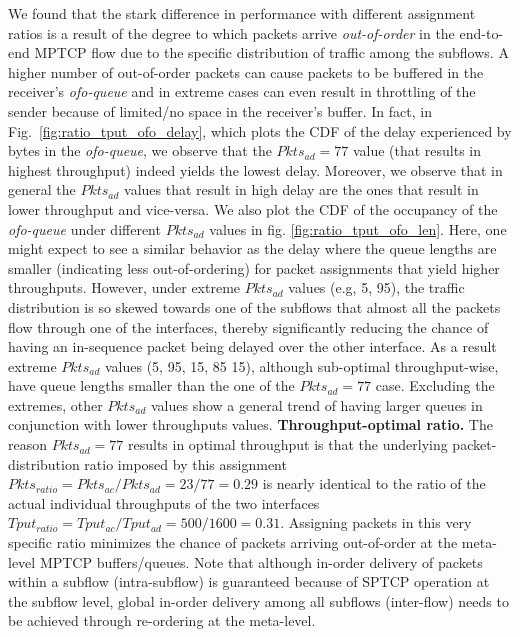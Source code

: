 We found that the stark difference in performance with different
assignment ratios is a result of the degree to which packets arrive
\textit{out-of-order} in the end-to-end MPTCP flow due to
the specific distribution of traffic among the subflows.
A higher number of out-of-order packets can cause
packets to be buffered in the receiver's \emph{ofo-queue} and in
extreme cases can even result in throttling of the sender because of
limited/no space in the receiver's buffer. In fact, in
Fig.~\ref{fig:ratio_tput_ofo_delay}, which plots the CDF of the delay
experienced by bytes in the \emph{ofo-queue}, we observe that
the $Pkts_{ad}=77$ value (that results in highest throughput) indeed
yields the lowest delay. Moreover, we observe that in general the
$Pkts_{ad}$ values that result in high delay are the ones that result
in lower throughput and vice-versa. 
We also plot the CDF of the
occupancy of the \emph{ofo-queue} under different $Pkts_{ad}$
values in fig. \ref{fig:ratio_tput_ofo_len}. Here, one might expect to
see a similar behavior as the delay where the queue lengths are smaller
(indicating less out-of-ordering) for packet assignments that yield
higher throughputs. However, under extreme $Pkts_{ad}$ values
(e.g, 5, 95), the traffic distribution is so skewed towards one of
the subflows that almost all the packets flow through one of
the interfaces, thereby significantly reducing the chance of having an
in-sequence packet being delayed over the other interface. As a result
extreme $Pkts_{ad}$ values (5, 95, 15, 85 15), although sub-optimal
throughput-wise, have queue lengths smaller than the one of the $Pkts_{ad}=77$ case.
Excluding the extremes, other $Pkts_{ad}$ values show a general trend of
having larger queues in conjunction with lower throughputs values.
\fi
\noindent\textbf{Throughput-optimal ratio.} The reason $Pkts_{ad}=77$ results in optimal throughput is that
the underlying packet-distribution ratio imposed by this assignment
$Pkts_{ratio}=Pkts_{ac}/Pkts_{ad}=23/77=0.29$ is nearly identical to
the ratio of the actual individual throughputs of the two interfaces
$Tput_{ratio}=Tput_{ac}/Tput_{ad}=500/1600=0.31$. Assigning packets in
this very specific ratio minimizes the chance of packets arriving
out-of-order at the meta-level MPTCP buffers/queues. Note that
although in-order delivery of packets within a subflow (intra-subflow)
is guaranteed because of SPTCP operation at the subflow level,
global in-order delivery among all subflows (inter-flow) needs
to be achieved through re-ordering at the meta-level.
